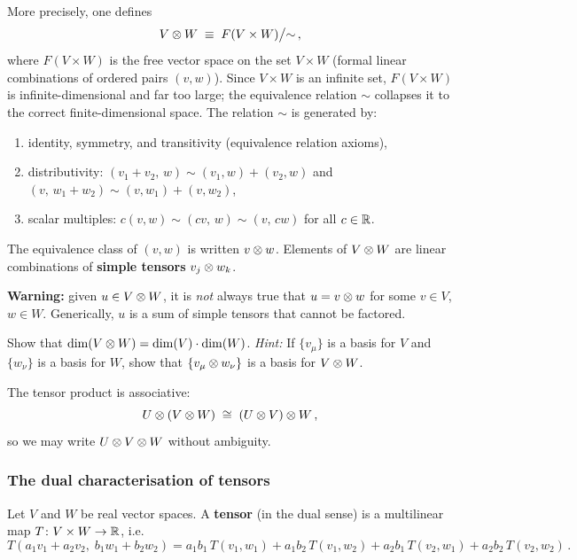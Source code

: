 More precisely, one defines
\begin{equation}\label{eq:tp-formal}
  V\otimes W \;\equiv\; F(V\times W)\big/{\sim}\,,
\end{equation}
where $F(V\times W)$ is the free vector space on the set
$V\times W$ (formal linear combinations of ordered pairs $(v,w)$).
Since $V\times W$ is an infinite set, $F(V\times W)$ is
infinite-dimensional and far too large; the equivalence relation
$\sim$ collapses it to the correct finite-dimensional space.  The
relation $\sim$ is generated by:
\begin{enumerate}
  \item identity, symmetry, and transitivity (equivalence relation
    axioms),
  \item distributivity:
    $(v_1+v_2,\,w) \sim (v_1,w) + (v_2,w)$ and
    $(v,\,w_1+w_2) \sim (v,w_1) + (v,w_2)$,
  \item scalar multiples:
    $c(v,w) \sim (cv,\,w) \sim (v,\,cw)$ for all $c\in\mathbb{R}$.
\end{enumerate}
The equivalence class of $(v,w)$ is written $v\otimes w$.  Elements of
$V\otimes W$ are linear combinations of \textbf{simple tensors}
$v_j\otimes w_k$.

\begin{keyresult}
  \textbf{Warning:} given $u\in V\otimes W$, it is \emph{not} always
  true that $u = v\otimes w$ for some $v\in V$, $w\in W$.  Generically,
  $u$ is a sum of simple tensors that cannot be factored.
\end{keyresult}

\begin{exercise}\label{ex:dim-tp}
  Show that $\dim(V\otimes W) = \dim(V)\cdot\dim(W)$.
  \emph{Hint:} If $\{v_\mu\}$ is a basis for $V$ and
  $\{w_\nu\}$ is a basis for $W$, show that
  $\{v_\mu\otimes w_\nu\}$ is a basis for $V\otimes W$.
\end{exercise}

\noindent
The tensor product is associative:
\begin{equation}\label{eq:tp-assoc}
  U\otimes(V\otimes W) \;\cong\; (U\otimes V)\otimes W\,,
\end{equation}
so we may write $U\otimes V\otimes W$ without ambiguity.

\subsubsection{The dual characterisation of tensors}

\begin{definition}\label{def:tensor-multilinear}
  Let $V$ and $W$ be real vector spaces.  A \textbf{tensor} (in
  the dual sense) is a multilinear map
  $T\colon V\times W \to \mathbb{R}$, i.e.\
  \begin{equation}\label{eq:multilinear}
    T(a_1 v_1 + a_2 v_2,\; b_1 w_1 + b_2 w_2)
    = a_1 b_1\, T(v_1,w_1)
    + a_1 b_2\, T(v_1,w_2)
    + a_2 b_1\, T(v_2,w_1)
    + a_2 b_2\, T(v_2,w_2)\,.
  \end{equation}
\end{definition}

